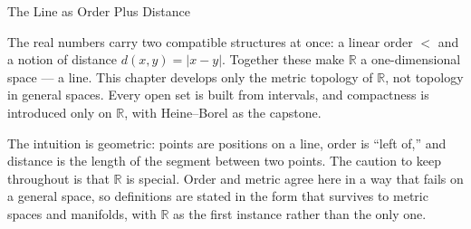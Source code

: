 \label{sec:real-line-one-dimensional}

\begin{topicbox}{The Line as Order Plus Distance}
\begin{exposition}
The real numbers carry two compatible structures at once: a linear order $<$ and a notion of distance $d(x,y)=|x-y|$. Together these make $\mathbb{R}$ a one-dimensional space --- a line. This chapter develops only the metric topology of $\mathbb{R}$, not topology in general spaces. Every open set is built from intervals, and compactness is introduced only on $\mathbb{R}$, with Heine--Borel as the capstone.
\end{exposition}
\begin{exposition}
The intuition is geometric: points are positions on a line, order is ``left of,'' and distance is the length of the segment between two points. The caution to keep throughout is that $\mathbb{R}$ is special. Order and metric agree here in a way that fails on a general space, so definitions are stated in the form that survives to metric spaces and manifolds, with $\mathbb{R}$ as the first instance rather than the only one.
\end{exposition}
\end{topicbox}
